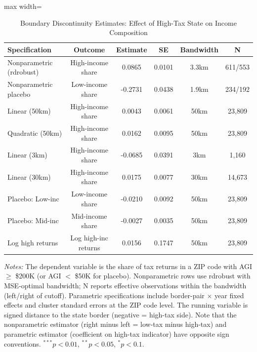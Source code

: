 \begin{table}[htbp]
\centering
\caption{Boundary Discontinuity Estimates: Effect of High-Tax State on Income Composition}
\label{tab:main_rdd}
\begin{adjustbox}{max width=\textwidth}
\begin{tabular}{lccccc}
  \hline
Specification & Outcome & Estimate & SE & Bandwidth & N \\ 
  \hline
Nonparametric (rdrobust) & High-income share &  0.0865 & 0.0101 & 3.3km & 611/553 \\ 
  Nonparametric placebo & Low-income share & -0.2731 & 0.0438 & 1.9km & 234/192 \\ 
  Linear (50km) & High-income share &  0.0043 & 0.0061 & 50km & 23,809 \\ 
  Quadratic (50km) & High-income share &  0.0162 & 0.0095 & 50km & 23,809 \\ 
  Linear (3km) & High-income share & -0.0685 & 0.0391 & 3km &  1,160 \\ 
  Linear (30km) & High-income share &  0.0175 & 0.0077 & 30km & 14,673 \\ 
  Placebo: Low-inc & Low-income share & -0.0210 & 0.0092 & 50km & 23,809 \\ 
  Placebo: Mid-inc & Mid-income share & -0.0027 & 0.0035 & 50km & 23,809 \\ 
  Log high returns & Log high-inc returns &  0.0156 & 0.1747 & 50km & 23,809 \\ 
   \hline
\end{tabular}
\end{adjustbox}
\begin{tablenotes}\small
\item \textit{Notes:} The dependent variable is the share of tax returns in a ZIP code with AGI $\geq$ \$200K (or AGI $<$ \$50K for placebo). Nonparametric rows use rdrobust with MSE-optimal bandwidth; N reports effective observations within the bandwidth (left/right of cutoff). Parametric specifications include border-pair $\times$ year fixed effects and cluster standard errors at the ZIP code level. The running variable is signed distance to the state border (negative = high-tax side). Note that the nonparametric estimator (right minus left = low-tax minus high-tax) and parametric estimator (coefficient on high-tax indicator) have opposite sign conventions. $^{***}p<0.01$, $^{**}p<0.05$, $^{*}p<0.1$.
\end{tablenotes}
\end{table}

